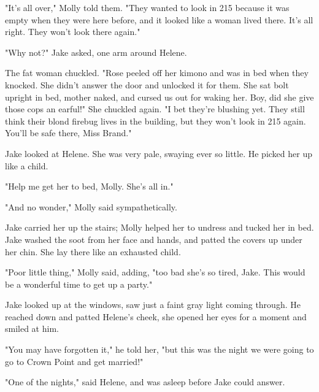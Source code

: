\documentclass{novel}
\begin{document}
"It’s all over," Molly told them. "They wanted to look in 215 because it was empty when they were here before, and it looked like a woman lived there. It’s all right. They won’t look there again."

"Why not?" Jake asked, one arm around Helene.

The fat woman chuckled. "Rose peeled off her kimono and was in bed when they knocked. She didn’t answer the door and unlocked it for them. She sat bolt upright in bed, mother naked, and cursed us out for waking her. Boy, did she give those cops an earful!" She chuckled again. "I bet they’re blushing yet. They still think their blond firebug lives in the building, but they won’t look in 215 again. You’ll be safe there, Miss Brand."

Jake looked at Helene. She was very pale, swaying ever so little. He picked her up like a child.

"Help me get her to bed, Molly. She’s all in."

"And no wonder," Molly said sympathetically.

Jake carried her up the stairs; Molly helped her to undress and tucked her in bed. Jake washed the soot from her face and hands, and patted the covers up under her chin. She lay there like an exhausted child.

"Poor little thing," Molly said, adding, "too bad she’s so tired, Jake. This would be a wonderful time to get up a party."

Jake looked up at the windows, saw just a faint gray light coming through. He reached down and patted Helene’s cheek, she opened her eyes for a moment and smiled at him.

"You may have forgotten it," he told her, "but this was the night we were going to go to Crown Point and get married!"

"One of the nights," said Helene, and was asleep before Jake could answer.

\vspace{2\nbs}
\clearpage
\thispagestyle{empty}

\begin{ChapterStart}
\vspace{3\nbs}
\end{ChapterStart}
\end{document}
